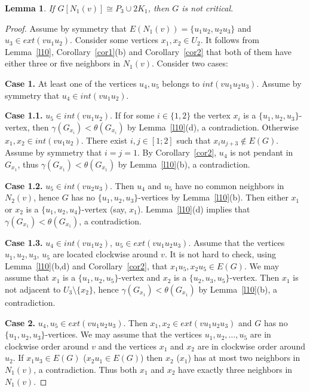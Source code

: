 \documentclass[12pt]{article}
\newtheorem{lemma}{Lemma}
\begin{document}
\begin{lemma}\label{l36}
If $G[N_1(v)] \cong P_3 \cup 2K_1$, then $G$ is not critical.
\end{lemma}

\begin{proof}

Assume by symmetry that $E(N_1(v)) = \{u_1u_2,u_2u_3\}$ and $u_3 \in ext(vu_1u_2)$. Consider some vertices $x_1,x_2 \in U_2$. It follows from Lemma~\ref{l10}, Corollary~\ref{cor1}(b) and Corollary~\ref{cor2} that both of them have either three or five neighbors in $N_1(v)$. Consider two cases: 

\textbf{Case 1.} At least one of the vertices $u_4,u_5$ belongs to $int(vu_1u_2u_3)$. Assume by symmetry that $u_4 \in int(vu_1u_2)$.

\textbf{Case 1.1.} $u_5 \in int(vu_1u_2)$. If for some $i \in \{1,2\}$ the vertex $x_i$ is a $\{u_1,u_2,u_3\}$-vertex, then $\gamma(G_{x_i}) < \theta(G_{x_i})$ by Lemma~\ref{l10}(d), a contradiction. Otherwise $x_1,x_2 \in int(vu_1u_2)$. There exist $i,j \in [1;2]$ such that $x_iu_{j+3} \notin E(G)$. Assume by symmetry that $i = j = 1$. By Corollary~\ref{cor2}, $u_4$ is not pendant in $G_{x_1}$, thus $\gamma(G_{x_1}) < \theta(G_{x_1})$ by Lemma~\ref{l10}(b), a contradiction.

\textbf{Case 1.2.} $u_5 \in int(vu_2u_3)$. Then $u_4$ and $u_5$ have no common neighbors in $N_2(v)$, hence $G$ has no $\{u_1,u_2,u_3\}$-vertices by Lemma~\ref{l10}(b). Then either $x_1$ or $x_2$ is a $\{u_1,u_2,u_4\}$-vertex (say, $x_1$). Lemma~\ref{l10}(d) implies that $\gamma(G_{x_1}) < \theta(G_{x_1})$, a contradiction.

\textbf{Case 1.3.}  $u_4 \in int(vu_1u_2)$, $u_5 \in ext(vu_1u_2u_3)$. Assume that the vertices $u_1,u_2,u_3$,  $u_5$ are located clockwise around $v$. It is not hard to check, using Lemma~\ref{l10}(b,d) and Corollary~\ref{cor2}, that $x_1u_5, x_2u_5 \in E(G)$. We may assume that $x_1$ is a $\{u_1,u_2,u_5\}$-vertex and $x_2$ is a $\{u_2,u_3,u_5\}$-vertex. Then $x_1$ is not adjacent to $U_3 \setminus \{x_2\}$, hence $\gamma(G_{x_1}) < \theta(G_{x_1})$ by Lemma~\ref{l10}(b), a contradiction.

\textbf{Case 2.} $u_4,u_5 \in ext(vu_1u_2u_3)$. Then $x_1,x_2 \in ext(vu_1u_2u_3)$ and $G$ has no $\{u_1,u_2,u_3\}$-vertices. We may assume that the vertices $u_1,u_2,\ldots,u_5$ are in clockwise order around $v$ and the vertices $x_1$ and $x_2$ are in clockwise order around $u_2$. If $x_1u_3 \in E(G)$ ($x_2u_1 \in E(G)$) then $x_2$ ($x_1$) has at most two neighbors in $N_1(v)$, a contradiction. Thus both $x_1$ and $x_2$ have exactly three neighbors in $N_1(v)$.


\end{proof}
\end{document}
